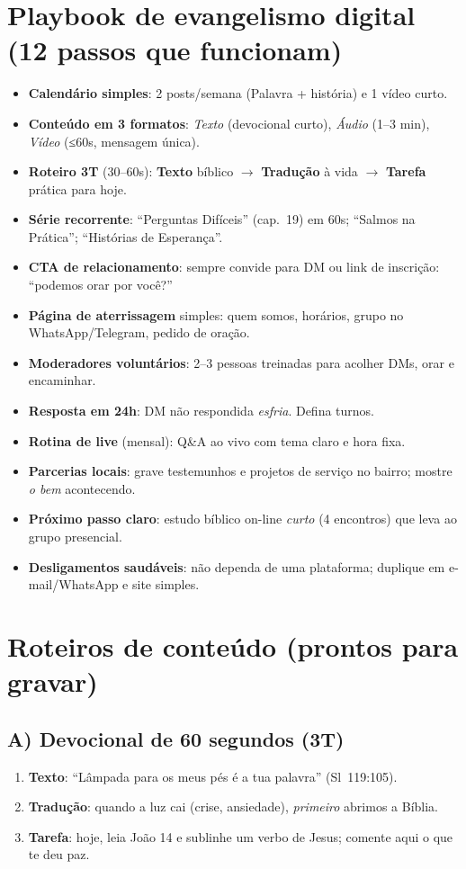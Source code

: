 \section{Playbook de evangelismo digital (12 passos que funcionam)}
\begin{checklist}[title={Produção e presença},breakable]
\begin{itemize}[leftmargin=*,noitemsep]
  \item \textbf{Calendário simples}: 2 posts/semana (Palavra + história) e 1 vídeo curto.
  \item \textbf{Conteúdo em 3 formatos}: \emph{Texto} (devocional curto), \emph{Áudio} (1--3 min), \emph{Vídeo} (≤60s, mensagem única).
  \item \textbf{Roteiro 3T} (30--60s): \textbf{Texto} bíblico $\rightarrow$ \textbf{Tradução} à vida $\rightarrow$ \textbf{Tarefa} prática para hoje.
  \item \textbf{Série recorrente}: “Perguntas Difíceis” (cap.~19) em 60s; “Salmos na Prática”; “Histórias de Esperança”.
  \item \textbf{CTA de relacionamento}: sempre convide para DM ou link de inscrição: “podemos orar por você?”
  \item \textbf{Página de aterrissagem} simples: quem somos, horários, grupo no WhatsApp/Telegram, pedido de oração.
  \item \textbf{Moderadores voluntários}: 2--3 pessoas treinadas para acolher DMs, orar e encaminhar.
  \item \textbf{Resposta em 24h}: DM não respondida \emph{esfria}. Defina turnos.
  \item \textbf{Rotina de live} (mensal): Q\&A ao vivo com tema claro e hora fixa.
  \item \textbf{Parcerias locais}: grave testemunhos e projetos de serviço no bairro; mostre \emph{o bem} acontecendo.
  \item \textbf{Próximo passo claro}: estudo bíblico on-line \emph{curto} (4 encontros) que leva ao grupo presencial.
  \item \textbf{Desligamentos saudáveis}: não dependa de uma plataforma; duplique em e-mail/WhatsApp e site simples.
\end{itemize}
\end{checklist}

\section{Roteiros de conteúdo (prontos para gravar)}
\subsection*{A) Devocional de 60 segundos (3T)}
\begin{enumerate}[leftmargin=*,nosep]
  \item \textbf{Texto}: ``Lâmpada para os meus pés é a tua palavra'' (Sl~119:105).
  \item \textbf{Tradução}: quando a luz cai (crise, ansiedade), \emph{primeiro} abrimos a Bíblia.
  \item \textbf{Tarefa}: hoje, leia João 14 e sublinhe um verbo de Jesus; comente aqui o que te deu paz.
\end{enumerate}
